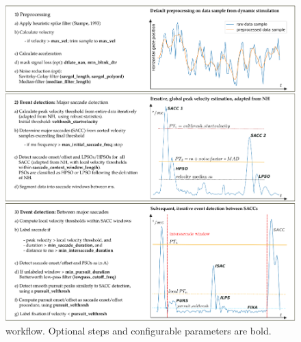     \begin{figure}
        \includegraphics[width=1\textwidth]{img/remodnav_algorithm_v2.eps}
        \caption{\remodnav workflow. Optional steps and configurable parameters are bold.}
        \label{fig:alg}
    \end{figure}

